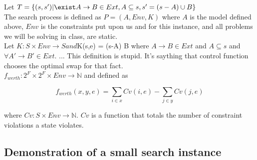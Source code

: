 \documentclass{article}
\begin{document}
Let $T = \{(s,s') | \exist A \rightarrow B \in Ext , A \subseteq s ,
s' = (s - A) \cup B\}$\\

The search process is defined as $P = (A, Env, K)$ where $A$ is the
model defined above, $Env$ is the constraints put upon us and for this
instance, and all problems we will be solving in class, are static.\\

Let $K: S \times Env \rightarrow S and $K(s,e) = (s-A) \cup B where $A
\rightarrow B \in Ext$ and $A \subseteq s$ and $\forall A' \rightarrow
B' \in Ext.$ ... This definition is stupid. It's saything that
control function chooses the optimal swap for that fact.\\

$f_{werth}: 2^F \times 2^F \times Env \rightarrow \mathbb{N}$ and
defined as

\[
f_{werth}(x, y, e) = \sum_{i \in x}Cv(i, e) - \sum_{j \in y}Cv(j, e)
\]

where $Cv: S \times Env \rightarrow \mathbb{N}$. $Cv$ is a function
that totals the number of constraint violations a state violates.


\subsection{Demonstration of a small search instance}
\end{document}

